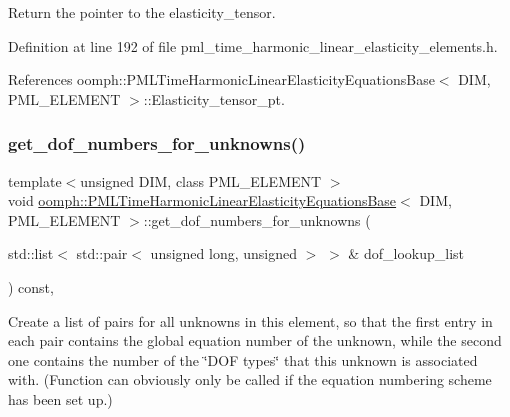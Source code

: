 Return the pointer to the elasticity\+\_\+tensor. 



Definition at line 192 of file pml\+\_\+time\+\_\+harmonic\+\_\+linear\+\_\+elasticity\+\_\+elements.\+h.



References oomph\+::\+P\+M\+L\+Time\+Harmonic\+Linear\+Elasticity\+Equations\+Base$<$ D\+I\+M, P\+M\+L\+\_\+\+E\+L\+E\+M\+E\+N\+T $>$\+::\+Elasticity\+\_\+tensor\+\_\+pt.

\mbox{\label{classoomph_1_1PMLTimeHarmonicLinearElasticityEquationsBase_a99ebd7d2a04356e12bf02630e89c8836}} 
\subsubsection{\texorpdfstring{get\+\_\+dof\+\_\+numbers\+\_\+for\+\_\+unknowns()}{get\_dof\_numbers\_for\_unknowns()}}
{\footnotesize\ttfamily template$<$unsigned D\+IM, class P\+M\+L\+\_\+\+E\+L\+E\+M\+E\+NT $>$ \\
void \hyperlink{classoomph_1_1PMLTimeHarmonicLinearElasticityEquationsBase}{oomph\+::\+P\+M\+L\+Time\+Harmonic\+Linear\+Elasticity\+Equations\+Base}$<$ D\+IM, P\+M\+L\+\_\+\+E\+L\+E\+M\+E\+NT $>$\+::get\+\_\+dof\+\_\+numbers\+\_\+for\+\_\+unknowns (\begin{DoxyParamCaption}\item[{std\+::list$<$ std\+::pair$<$ unsigned long, unsigned $>$ $>$ \&}]{dof\+\_\+lookup\+\_\+list }\end{DoxyParamCaption}) const\hspace{0.3cm}{\ttfamily [inline]}, {\ttfamily [virtual]}}



Create a list of pairs for all unknowns in this element, so that the first entry in each pair contains the global equation number of the unknown, while the second one contains the number of the \char`\"{}\+D\+O\+F types\char`\"{} that this unknown is associated with. (Function can obviously only be called if the equation numbering scheme has been set up.) 



